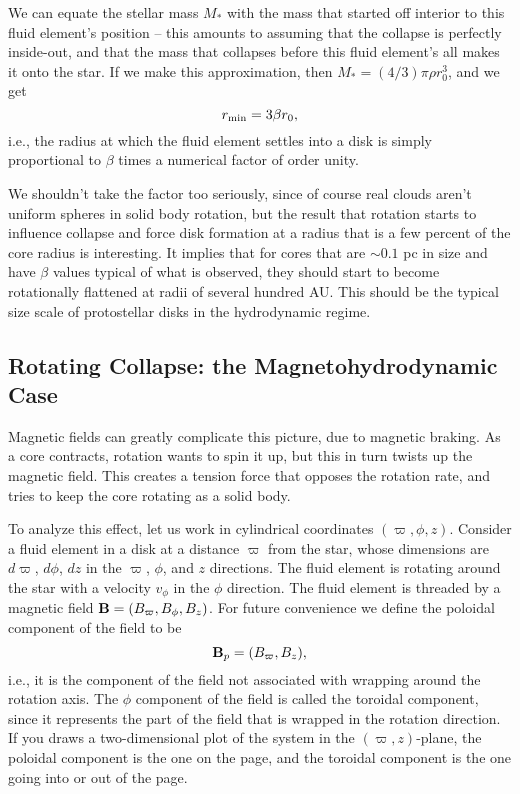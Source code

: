 We can equate the stellar mass $M_*$ with the mass that started off interior to this fluid element's position -- this amounts to assuming that the collapse is perfectly inside-out, and that the mass that collapses before this fluid element's all makes it onto the star. If we make this approximation, then $M_*=(4/3)\pi \rho r_0^3$, and we get
\begin{equation}
r_{\rm min} = 3 \beta r_0,
\end{equation}
i.e., the radius at which the fluid element settles into a disk is simply proportional to $\beta$ times a numerical factor of order unity.

We shouldn't take the factor too seriously, since of course real clouds aren't uniform spheres in solid body rotation, but the result that rotation starts to influence collapse and force disk formation at a radius that is a few percent of the core radius is interesting. It implies that for cores that are $\sim 0.1$ pc in size and have $\beta$ values typical of what is observed, they should start to become rotationally flattened at radii of several hundred AU. This should be the typical size scale of protostellar disks in the hydrodynamic regime.

\subsection{Rotating Collapse: the Magnetohydrodynamic Case}

Magnetic fields can greatly complicate this picture, due to magnetic braking. As a core contracts, rotation wants to spin it up, but this in turn twists up the magnetic field. This creates a tension force that opposes the rotation rate, and tries to keep the core rotating as a solid body.

To analyze this effect, let us work in cylindrical coordinates $(\varpi, \phi, z)$. Consider a fluid element in a disk at a distance $\varpi$ from the star, whose dimensions are $d\varpi$, $d\phi$, $dz$ in the $\varpi$, $\phi$, and $z$ directions. The fluid element is rotating around the star with a velocity $v_{\phi}$ in the $\phi$ direction. The fluid element is threaded by a magnetic field $\mathbf{B}=(B_\varpi, B_\phi, B_z)$. For future convenience we define the poloidal component of the field to be
\begin{equation}
\mathbf{B}_p = (B_\varpi, B_z),
\end{equation}
i.e., it is the component of the field not associated with wrapping around the rotation axis. The $\phi$ component of the field is called the toroidal component, since it represents the part of the field that is wrapped in the rotation direction. If you draws a two-dimensional plot of the system in the $(\varpi, z)$-plane, the poloidal component is the one on the page, and the toroidal component is the one going into or out of the page.


